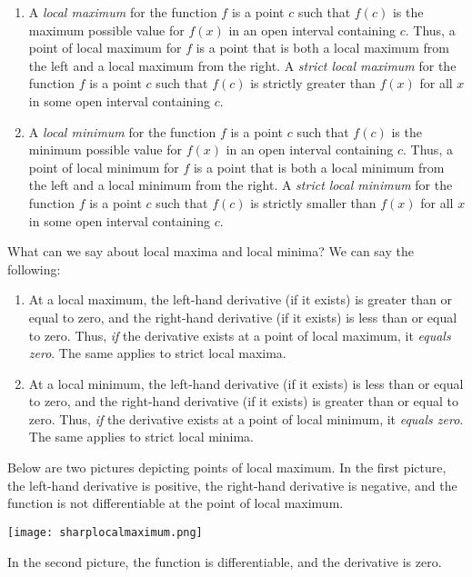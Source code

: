 \documentclass[10pt]{amsart}
\begin{document}
\begin{enumerate}
\item A {\em local maximum} for the function $f$ is a point $c$ such
  that $f(c)$ is the maximum possible value for $f(x)$ in an open
  interval containing $c$. Thus, a point of local maximum for $f$ is a
  point that is both a local maximum from the left and a local maximum
  from the right. A {\em strict local maximum} for the function $f$ is
  a point $c$ such that $f(c)$ is strictly greater than $f(x)$ for all
  $x$ in some open interval containing $c$.
\item A {\em local minimum} for the function $f$ is a point $c$ such
  that $f(c)$ is the minimum possible value for $f(x)$ in an open
  interval containing $c$. Thus, a point of local minimum for $f$ is a
  point that is both a local minimum from the left and a local minimum
  from the right. A {\em strict local minimum} for the function $f$ is
  a point $c$ such that $f(c)$ is strictly smaller than $f(x)$ for all
  $x$ in some open interval containing $c$.
\end{enumerate}

What can we say about local maxima and local minima? We can say the
following:

\begin{enumerate}
\item At a local maximum, the left-hand derivative (if it exists) is
  greater than or equal to zero, and the right-hand derivative (if it
  exists) is less than or equal to zero. Thus, {\em if} the derivative
  exists at a point of local maximum, it {\em equals zero}. The same
  applies to strict local maxima.
\item At a local minimum, the left-hand derivative (if it exists) is
  less than or equal to zero, and the right-hand derivative (if it
  exists) is greater than or equal to zero. Thus, {\em if} the
  derivative exists at a point of local minimum, it {\em equals
  zero}. The same applies to strict local minima.
\end{enumerate}

Below are two pictures depicting points of local maximum. In the first
picture, the left-hand derivative is positive, the right-hand
derivative is negative, and the function is not differentiable at the
point of local maximum. 

\texttt{[image: sharplocalmaximum.png]}

In the second picture, the function is differentiable, and the
derivative is zero.
\end{document}
